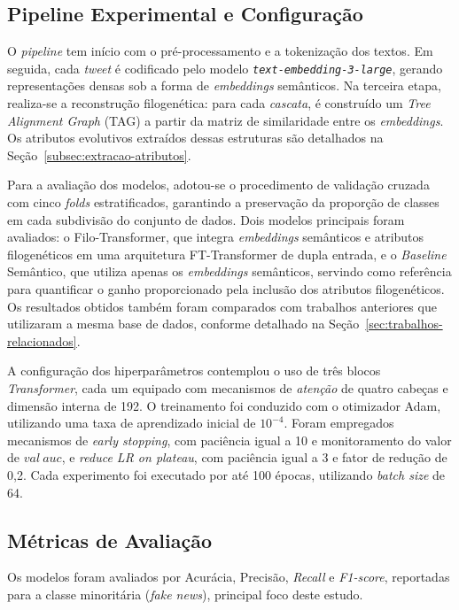 \documentclass[12pt]{article}
\begin{document}
\subsection{Pipeline Experimental e Configuração} \label{subsec:pipeline-configuracao}
O \textit{pipeline} tem início com o pré-processamento e a tokenização dos textos. Em seguida, cada \textit{tweet} é codificado pelo modelo \texttt{\textit{text-embedding-3-large}}, gerando representações densas sob a forma de \textit{embeddings} semânticos. Na terceira etapa, realiza-se a reconstrução filogenética: para cada \textit{cascata}, é construído um \textit{Tree Alignment Graph} (TAG) a partir da matriz de similaridade entre os \textit{embeddings}. Os atributos evolutivos extraídos dessas estruturas são detalhados na Seção~\ref{subsec:extracao-atributos}.

Para a avaliação dos modelos, adotou-se o procedimento de validação cruzada com cinco \textit{folds} estratificados, garantindo a preservação da proporção de classes em cada subdivisão do conjunto de dados. Dois modelos principais foram avaliados: o Filo-Transformer, que integra \textit{embeddings} semânticos e atributos filogenéticos em uma arquitetura FT-Transformer de dupla entrada, e o \textit{Baseline} Semântico, que utiliza apenas os \textit{embeddings} semânticos, servindo como referência para quantificar o ganho proporcionado pela inclusão dos atributos filogenéticos. Os resultados obtidos também foram comparados com trabalhos anteriores que utilizaram a mesma base de dados, conforme detalhado na Seção~\ref{sec:trabalhos-relacionados}.

A configuração dos hiperparâmetros contemplou o uso de três blocos \textit{Transformer}, cada um equipado com mecanismos de \textit{atenção} de quatro cabeças e dimensão interna de 192. O treinamento foi conduzido com o otimizador Adam, utilizando uma taxa de aprendizado inicial de $10^{-4}$. Foram empregados mecanismos de \textit{early stopping}, com paciência igual a 10 e monitoramento do valor de $val\ auc$, e \textit{reduce LR on plateau}, com paciência igual a 3 e fator de redução de 0,2. Cada experimento foi executado por até 100 épocas, utilizando \textit{batch size} de 64.

\subsection{Métricas de Avaliação} \label{subsec:metricas}
Os modelos foram avaliados por Acurácia, Precisão, \textit{Recall} e \textit{F1-score}, reportadas para a classe minoritária (\textit{fake news}), principal foco deste estudo.
\end{document}
